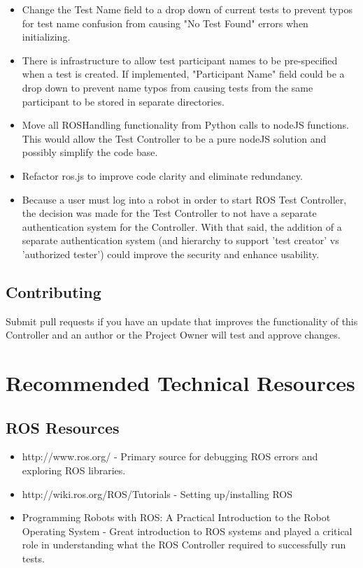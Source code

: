 \documentclass[onecolumn, draftclsnofoot,10pt, compsoc]{report}
\begin{document}
\begin{itemize}
	\item Change the Test Name field to a drop down of current tests to prevent typos for test name confusion from causing "No Test Found" errors when initializing.

	\item There is infrastructure to allow test participant names to be pre-specified when a test is created. If implemented, "Participant Name" field could be a drop down to prevent name typos from causing tests from the same participant to be stored in separate directories.

	\item Move all ROSHandling functionality from Python calls to nodeJS functions. This would allow the Test Controller to be a pure nodeJS solution and possibly simplify the code base.

	\item Refactor ros.js to improve code clarity and eliminate redundancy.

	\item Because a user must log into a robot in order to start ROS Test Controller, the decision was made for the Test Controller to not have a separate authentication system for the Controller. With that said, the addition of a separate authentication system (and hierarchy to support 'test creator' vs 'authorized tester') could improve the security and enhance usability.
\end{itemize}

\section{Contributing}

Submit pull requests if you have an update that improves the functionality of this Controller and an author or the Project Owner will test and approve changes.

\chapter{Recommended Technical Resources}
\minitoc
\section{ROS Resources}
\begin{itemize}
	\item http://www.ros.org/ - Primary source for debugging ROS errors and exploring ROS libraries.
	\item http://wiki.ros.org/ROS/Tutorials - Setting up/installing ROS
	\item Programming Robots with ROS: A Practical Introduction to the Robot Operating System - Great introduction to ROS systems and played a critical role in understanding what the ROS Controller required to successfully run tests.
\end{itemize}
\end{document}
